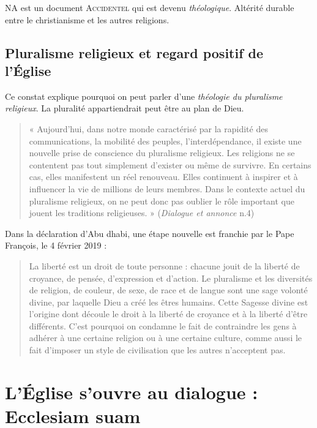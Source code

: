   
  NA est un document \textsc{Accidentel} qui est devenu \textit{théologique}. Altérité durable entre le christianisme et les autres religions. 
  
  
   \subsection{ Pluralisme religieux et regard positif de l’Église }
 
 Ce constat explique pourquoi on peut parler d'une \textit{théologie du pluralisme religieux}. La pluralité appartiendrait peut être au plan de Dieu. 
 
 \begin{quote}
     « Aujourd’hui, dans notre monde caractérisé par la rapidité des communications, la mobilité des peuples, l’interdépendance, il existe une nouvelle prise de conscience du pluralisme religieux. Les religions ne se contentent pas tout simplement d’exister ou même de survivre. En certains cas, elles manifestent un réel renouveau. Elles continuent à inspirer et à influencer la vie de millions de leurs membres. Dans le contexte actuel du pluralisme religieux, on ne peut donc pas oublier le rôle important que jouent les traditions religieuses. » (\textit{Dialogue et annonce} n.4) 
 \end{quote}
 
 Dans la déclaration d'Abu dhabi, une étape nouvelle est franchie par le Pape François, le 4 février 2019 : 
 
 \begin{quote}
     La liberté est un droit de toute personne : chacune jouit de la liberté de croyance, de pensée, d’expression et d’action. Le pluralisme et les diversités de religion, de couleur, de sexe, de race et de langue sont une sage volonté divine, par laquelle Dieu a créé les êtres humains. Cette Sagesse divine est l’origine dont découle le droit à la liberté de croyance et à la liberté d’être différents. C’est pourquoi on condamne le fait de contraindre les gens à adhérer à une certaine religion ou à une certaine culture, comme aussi le fait d’imposer un style de civilisation que les autres n’acceptent pas.
 \end{quote}
 \section{L’Église s’ouvre au dialogue : Ecclesiam suam}
 
